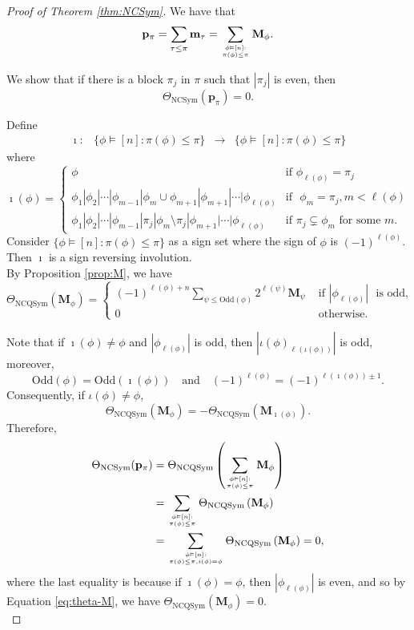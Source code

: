\documentclass[11pt]{amsart}
\numberwithin{equation}{section}
\newcommand{\NCQSym}{\mathrm{NCQSym}}
\newcommand{\NCSym}{\mathrm{NCSym}}
\newcommand{\odd}{\mathrm{Odd}}
\newcommand{\bfM}{{\mathbf{M}}}
\begin{document}
\begin{proof}[Proof of Theorem \ref{thm:NCSym}]
	We have that
	$$\displaystyle\mathbf{p}_{\pi}=\sum_{\tau\leq \pi}\mathbf{m}_{\tau}=\sum_{\phi\vDash [n]:\atop  \pi(\phi)\leq \pi}\mathbf{M}_{\phi}.$$
	
	We show that if  there is a block $\pi_j$ in $\pi$ such that $|\pi_j|$ is even, then 
	$$\Theta_{\NCSym}(\mathbf{p}_{\pi})=0.$$ 
	
Define
	$$\begin{array}{cccc}
	\imath: & \{\phi\vDash [n]: \pi(\phi)\leq \pi\} & \rightarrow &  \{\phi\vDash [n]: \pi(\phi)\leq \pi\}
	\end{array} 
	$$
	where 
	$$\imath(\phi)=
	\begin{cases} 
	\phi & \text{if~}\phi_{\ell(\phi)}=\pi_j\\
	\phi_1|\phi_2|\cdots|\phi_{m-1}|\phi_m\cup \phi_{m+1}|\phi_{m+1}|\cdots|\phi_{\ell(\phi)} & \text{if ~} \phi_m=\pi_j, m<\ell(\phi)\\
	\phi_1|\phi_2|\cdots|\phi_{m-1}|\pi_j|\phi_m\setminus \pi_j|\phi_{m+1}|\cdots|\phi_{\ell(\phi)} & \text{if~} \pi_j\subsetneq \phi_m \text{~for some~} m.
	\end{cases} 
	$$
	Consider $\{\phi\vDash [n]: \pi(\phi)\leq \pi\}$ as a sign set where the sign of $\phi$ is $(-1)^{\ell(\phi)}$. Then $\imath$ is a sign reversing involution. \\
	
By Proposition \ref{prop:M}, we have
\begin{equation}\label{eq:theta-M}
\Theta_{\NCQSym}(\mathbf{M}_{\phi})
		=\begin{cases}
		(-1)^{\ell(\phi)+n}\displaystyle\sum_{\psi\leq \odd(\phi)}2^{\ell(\psi)}\mathbf{M}_{\psi} & \text{ if $|\phi_{\ell(\phi)}|$}  \text{~ is odd,}\\
		0 & \text{ otherwise.}
	\end{cases}
	\end{equation}
		
	 Note that if $\imath(\phi)\neq \phi$ and $|\phi_{\ell(\phi)}|$ is odd, then $|\iota(\phi)_{\ell(\iota(\phi))}|$ is odd, moreover,
	$$\odd(\phi)=\odd(\imath(\phi)) \quad \text{and}\quad (-1)^{\ell(\phi)}=(-1)^{\ell(\imath(\phi))\pm 1}.$$  Consequently, if $\iota(\phi)\neq \phi$, 
	$$\Theta_{\NCQSym}(\bfM_\phi)=-\Theta_{\NCQSym}(\bfM_{\imath(\phi)}).$$
	Therefore, 
	\begin{align*}
	\Theta_{\NCSym}(\mathbf{p}_\pi)&=\Theta_{\NCQSym}\left(\sum_{\phi\vDash [n]:\atop  \pi(\phi)\leq \pi}\mathbf{M}_{\phi} \right)\\
	&=\sum_{\phi\vDash [n]:\atop  \pi(\phi)\leq \pi}\Theta_{\NCQSym}\left(\mathbf{M}_{\phi}\right)\\
	&=\sum_{\phi\vDash[n]:\atop \pi(\phi)\leq \pi, \imath(\phi)=\phi}\Theta_{\NCQSym}\left(\mathbf{M}_{\phi}\right)=0,
	\end{align*}
	where the last equality is because if $\imath(\phi)=\phi$, then $|\phi_{\ell(\phi)}|$ is even, and so by Equation \ref{eq:theta-M}, we have $\Theta_{\NCQSym}\left(\mathbf{M}_{\phi}\right)=0$.\\
	


\end{proof}
\end{document}
